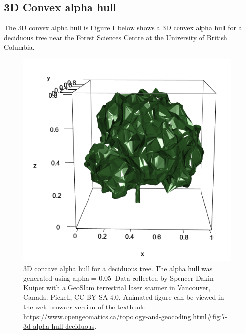 \documentclass[
]{book}
\begin{document}
\subsection{3D Convex alpha hull}\label{d-convex-alpha-hull}

The 3D convex alpha hull is Figure \ref{fig:7-3d-alpha-hull-deciduous} below shows a 3D convex alpha hull for a deciduous tree near the Forest Sciences Centre at the University of British Columbia.





\begin{figure}
\includegraphics[width=0.75\linewidth]{images/07-3d-alpha-hull-deciduous-static} \caption{3D concave alpha hull for a deciduous tree. The alpha hull was generated using alpha = 0.05. Data collected by Spencer Dakin Kuiper with a GeoSlam terrestrial laser scanner in Vancouver, Canada. Pickell, CC-BY-SA-4.0. Animated figure can be viewed in the web browser version of the textbook: \url{https://www.opengeomatics.ca/topology-and-geocoding.html\#fig:7-3d-alpha-hull-deciduous}.}\label{fig:7-3d-alpha-hull-deciduous}
\end{figure}
\end{document}
